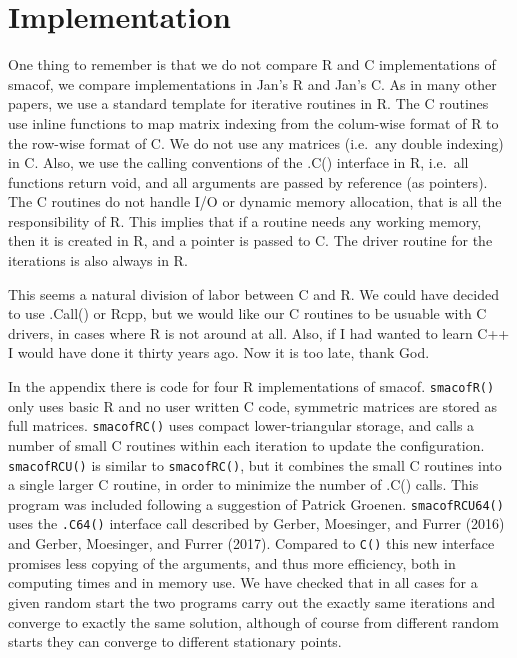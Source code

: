 \documentclass[12pt,]{article}
\begin{document}
\section{Implementation}\label{implementation}

One thing to remember is that we do not compare R and C implementations
of smacof, we compare implementations in Jan's R and Jan's C. As in many
other papers, we use a standard template for iterative routines in R.
The C routines use inline functions to map matrix indexing from the
colum-wise format of R to the row-wise format of C. We do not use any
matrices (i.e.~any double indexing) in C. Also, we use the calling
conventions of the .C() interface in R, i.e.~all functions return void,
and all arguments are passed by reference (as pointers). The C routines
do not handle I/O or dynamic memory allocation, that is all the
responsibility of R. This implies that if a routine needs any working
memory, then it is created in R, and a pointer is passed to C. The
driver routine for the iterations is also always in R.

This seems a natural division of labor between C and R. We could have
decided to use .Call() or Rcpp, but we would like our C routines to be
usuable with C drivers, in cases where R is not around at all. Also, if
I had wanted to learn C++ I would have done it thirty years ago. Now it
is too late, thank God.

In the appendix there is code for four R implementations of smacof.
\texttt{smacofR()} only uses basic R and no user written C code,
symmetric matrices are stored as full matrices. \texttt{smacofRC()} uses
compact lower-triangular storage, and calls a number of small C routines
within each iteration to update the configuration. \texttt{smacofRCU()}
is similar to \texttt{smacofRC()}, but it combines the small C routines
into a single larger C routine, in order to minimize the number of .C()
calls. This program was included following a suggestion of Patrick
Groenen. \texttt{smacofRCU64()} uses the \texttt{.C64()} interface call
described by Gerber, Moesinger, and Furrer (2016) and Gerber, Moesinger,
and Furrer (2017). Compared to \texttt{C()} this new interface promises
less copying of the arguments, and thus more efficiency, both in
computing times and in memory use. We have checked that in all cases for
a given random start the two programs carry out the exactly same
iterations and converge to exactly the same solution, although of course
from different random starts they can converge to different stationary
points.
\end{document}
